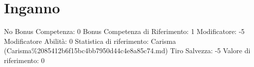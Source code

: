 \section{Inganno}\label{inganno}

\begin{description}
\tightlist
\item[Tags: ABI]
No Bonus Competenza: 0 Bonus Competenza di Riferimento: 1 Modificatore:
-5 Modificatore Abilità: 0 Statistica di riferimento: Carisma
(Carisma\%2085412b6f15bc4bb7950d44c4e8a85c74.md) Tiro Salvezza: -5
Valore di riferimento: 0
\end{description}
